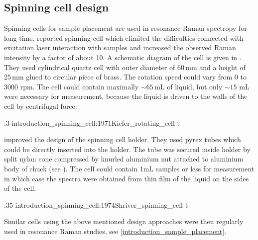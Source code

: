 \subsection{Spinning cell design}
\label{introduction_spinning_cell}

Spinning cells for sample placement are used in resonance Raman spectropy for
long time.
\textcite{Kiefer1971}
reported spinning cell which elimited the difficulties connected with
excitation laser interaction with samples and increased the observed Raman
intensity by a factor of about 10. A schematic diagram of the cell is given in
.
They used cylindrical quartz cell with outer diameter of 60\,mm and a height
of 25\,mm glued to circular piece of brass. The rotation speed could vary from
0 to 3000 rpm. The cell could contain maximally $\sim 65$\,mL of liquid, but
only $\sim 15$ mL were necessary for measurement, because the liquid is driven
to the walls of the cell by centrifugal force.

%
{.3}%
{introduction_spinning_cell:1971Kiefer_rotating_cell}%
{t}

\textcite{Shriver1974} improved the design of the spinning cell holder. They
used pyrex tubes which could be directly inserted into the holder. The tube
was secured inside holder by split nylon cone compressed by knurled aluminium
nut attached to aluminium body of chuck (see
).
The cell could contain 1mL samples or less for measurement in which case the
spectra were obtained from thin film of the liquid on the sides of the cell.

%
{.35}%
{introduction_spinning_cell:1974Shriver_spinning_cell}
{t}

Similar cells using the above mentioned design approaches were then regularly
used in resonance Raman studies, see
\cref{introduction_sample_placement}.
